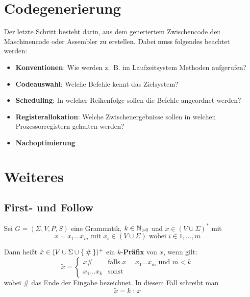 \section{Codegenerierung}
Der letzte Schritt besteht darin, aus dem generiertem Zwischencode den 
Maschinencode oder Assembler zu erstellen. Dabei muss folgendes beachtet werden:
\begin{itemize}
    \item \textbf{Konventionen}: Wie werden z.~B. im Laufzeitsystem Methoden aufgerufen?
    \item \textbf{Codeauswahl}: Welche Befehle kennt das Zielsystem?
    \item \textbf{Scheduling}: In welcher Reihenfolge sollen die Befehle angeordnet werden?
    \item \textbf{Registerallokation}: Welche Zwischenergebnisse sollen in welchen Prozessorregistern gehalten werden?
    \item \textbf{Nachoptimierung}
\end{itemize}

\section{Weiteres}
\subsection{First- und Follow}
\begin{definition}[$k$-Präfix]%
    Sei $G = (\Sigma, V, P, S)$ eine Grammatik, $k \in \mathbb{N}_{> 0}$ und
    $x \in (V \cup \Sigma)^*$ mit
    \[x = x_1 \dots x_m \text{ mit } x_i \in (V \cup \Sigma) \text{ wobei } i \in 1, \dots, m\]

    Dann heißt $\tilde{x} \in (V \cup \Sigma \cup \Set{\#})^+$ ein $k$-\textbf{Präfix} von $x$,
    wenn gilt:
    \[\tilde{x} = 
    \begin{cases}
        x\#           &\text{falls } x = x_1 \dots x_m \text{ und } m < k\\
        x_1 \dots x_k &\text{sonst}
    \end{cases}\]
    wobei $\#$ das Ende der Eingabe bezeichnet. In diesem Fall schreibt man
    \[ \tilde{x} = k\ :\ x\]
\end{definition}


